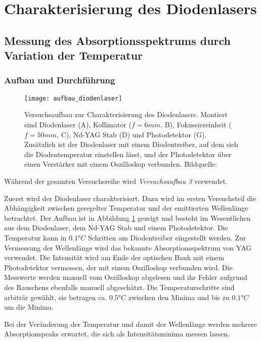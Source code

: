 \documentclass{../Misc/MontavonLaTeX/Montavon}
\newcommand{\fullwidth}{1.0\textwidth}
\begin{document}
\section{Charakterisierung des Diodenlasers}

\subsection{Messung des Absorptionsspektrums durch Variation der Temperatur}
\subsubsection{Aufbau und Durchführung}
\begin{figure}[htbp]
\centering
\texttt{[image: aufbau\_diodenlaser]}
\caption{Versuchsaufbau zur Charakterisierung des Diodenlasers. Montiert sind Diodenlaser (A), Kollimator ($f = 6 \unit{mm}$, B), Fokussiereinheit ($f = 50 \unit{mm}$, C), Nd-YAG Stab (D) und Photodetektor (G). Zusätzlich ist der Diodenlaser mit einem Diodentreiber, auf dem sich die Diodentemperatur einstellen lässt, und der Photodetektor über einen Verstärker mit einem Oszilloskop verbunden. Bildquelle: \cite[S. 33]{anleitung1}}
\label{fig:aufbau_diodenlaser}
\end{figure}


Während der gesamten Versuchsreihe wird \emph{Versuchsaufbau 3} verwendet. 

Zuerst wird der Diodenlaser charakterisiert. Dazu wird im ersten Versuchsteil die Abhängigkeit zwischen geregelter Temperatur und der emittierten Wellenlänge betrachtet. Der Aufbau ist in Abbildung \ref{fig:aufbau_diodenlaser} gezeigt und besteht im Wesentlichen aus dem Diodenlaser, dem Nd-YAG Stab und einem Photodetektor.
Die Temperatur kann in $0.1 \unit{\degree C}$ Schritten am Diodentreiber eingestellt werden. Zur Vermessung der Wellenlänge wird das bekannte Absorptionsspektrum von YAG verwendet. Die Intensität wird am Ende der optischen Bank mit einem Photodetektor vermessen, der mit einem Oszilloskop verbunden wird. Die Messwerte werden manuell vom Oszilloskop abgelesen und ihr Fehler aufgrund des Rauschens ebenfalls manuell abgeschätzt. Die Temperaturschritte sind arbiträr gewählt, sie betragen ca. $0.5 \unit{\degree C}$ zwischen den Minima und bis zu $0.1 \unit{\degree C}$ um die Minima.

Bei der Veränderung der Temperatur und damit der Wellenlänge werden mehrere Absorptionspeaks erwartet, die sich als Intensitätsminima messen lassen. 
\end{document}

